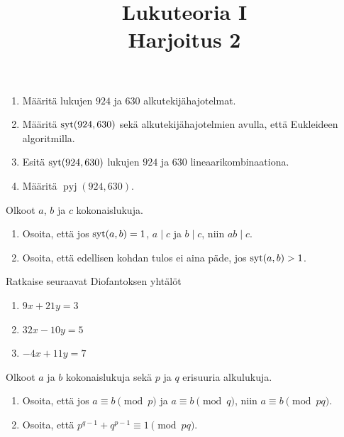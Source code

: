 \documentclass[11pt,a4paper]{amsart}
\title{Lukuteoria I\\Harjoitus 2}
\author{}
\date{}
\begin{document}

\begin{exercise}
  \leavevmode\par
  \begin{enumerate}[label=(\alph*), nosep]
    \item Määritä lukujen \(924\) ja \(630\) alkutekijähajotelmat.
    \item Määritä \(\operatorname{syt}(924, 630)\) sekä alkutekijähajotelmien avulla, että
      Eukleideen algoritmilla.
    \item Esitä \(\operatorname{syt}(924, 630)\) lukujen \(924\) ja \(630\)
      lineaarikombinaationa.
    \item Määritä \(\operatorname{pyj}(924, 630)\).
  \end{enumerate}
\end{exercise}

\begin{exercise}
  Olkoot \(a\), \(b\) ja \(c\) kokonaislukuja.
  \begin{enumerate}[label=(\alph*), nosep]
    \item Osoita, että jos \(\operatorname{syt}(a, b) = 1\), \(a \mid c\) ja
      \(b \mid c\), niin \(ab \mid c\).
    \item Osoita, että edellisen kohdan tulos ei aina päde, jos
      \(\operatorname{syt}(a, b) > 1\).
  \end{enumerate}
\end{exercise}

\begin{exercise}
  Ratkaise seuraavat Diofantoksen yhtälöt
  \begin{enumerate}[label=(\alph*), nosep]
    \item \(9x + 21y = 3\)
    \item \(32x - 10y = 5\)
    \item \(-4x + 11y = 7\)
  \end{enumerate}
\end{exercise}

\begin{exercise}
  Olkoot \(a\) ja \(b\) kokonaislukuja sekä \(p\) ja \(q\) erisuuria
  alkulukuja.
  \begin{enumerate}[label=(\alph*), nosep]
    \item Osoita, että jos \(a \equiv b \pmod{p}\) ja
      \(a \equiv b \pmod{q}\), niin \(a \equiv b \pmod{pq}\).
    \item Osoita, että \(p^{q-1} + q^{p-1} \equiv 1 \pmod{pq}\).
  \end{enumerate}
\end{exercise}
\end{document}
